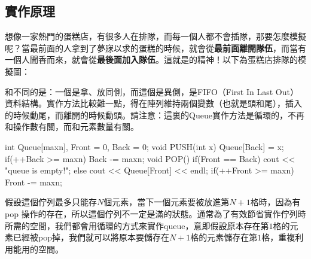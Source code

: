 \subsection{實作原理}
想像一家熱門的蛋糕店，有很多人在排隊，而每一個人都不會插隊，那要怎麼模擬呢？當最前面的人拿到了夢寐以求的蛋糕的時候，就會從\textbf{最前面離開隊伍}，而當有一個人聞香而來，就會從\textbf{最後面加入隊伍}。這就是的精神！以下為蛋糕店排隊的模擬圖：
\begin{center}
\end{center}
和不同的是：一個是拿、放同側，而這個是異側，是FIFO（First In Last Out）資料結構。實作方法比較難一點，得在陣列維持兩個變數（也就是頭和尾），插入的時候動尾，而離開的時候動頭。請注意：這裏的Queue實作方法是循環的，不再和操作數有關，而和元素數量有關。
\begin{C++}
int Queue[maxn], Front = 0, Back = 0;
void PUSH(int x) {
	Queue[Back] = x;
    if(++Back >= maxn) Back -= maxn;
}
void POP(){
    if(Front == Back)
        cout << "queue is empty!\n";
    else{
    	cout << Queue[Front] << endl;
        if(++Front >= maxn) Front -= maxn;
    }
}
\end{C++}
\indent\indent 假設這個佇列最多只能存$N$個元素，當下一個元素要被放進第$N+1$格時，因為有 pop 操作的存在，所以這個佇列不一定是滿的狀態。通常為了有效節省實作佇列時所需的空間，我們都會用循環的方式來實作queue，意即假設原本存在第$1$格的元素已經被pop掉，我們就可以將原本要儲存在$N+1$格的元素儲存在第$1$格，重複利用能用的空間。

